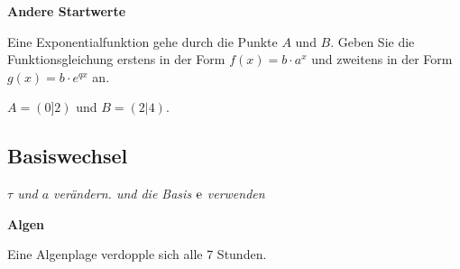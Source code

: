 \platzFuerBerechnungenBisEndeSeite{}




\bbwActAufgabenNr{} \textbf{Andere Startwerte}

Eine Exponentialfunktion gehe durch die Punkte $A$ und $B$. Geben Sie
die Funktionsgleichung erstens in der Form $f(x)=b\cdot{} a^x$ und
zweitens in der Form $g(x)=b\cdot{} e^{qx}$ an.

\begin{bbwAufgabenBlock}
\item $A=(0]2)$ und $B=(2|4)$.
\end{bbwAufgabenBlock}


\platzFuerBerechnungenBisEndeSeite{}










































\subsection{Basiswechsel}
\textit{$\tau$ und $a$ verändern. und die Basis $\operatorname{\mathrm{e}}$ verwenden}






\bbwActAufgabenNr{} \textbf{Algen}

Eine Algenplage verdopple sich alle 7 Stunden.

